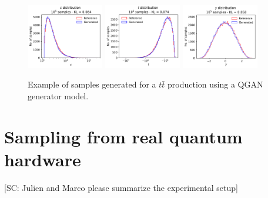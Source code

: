 \documentclass[twocolumn,preprintnumbers,superscriptaddress]{revtex4-2}
\begin{document}
\begin{figure}


  \includegraphics[width=0.3\textwidth]{plots/LHCttbar/s-distribution_LHCdata_100k.pdf}%
  \includegraphics[width=0.3\textwidth]{plots/LHCttbar/t-distribution_LHCdata_100k.pdf}%
  \includegraphics[width=0.3\textwidth]{plots/LHCttbar/y-distribution_LHCdata_100k.pdf}

  \caption{\label{fig:ttbar_2}Example of samples generated for a $t\bar{t}$
    production using a QGAN generator model.}
\end{figure}

\section{Sampling from real quantum hardware}
\label{sec:deployment}

{\color{red}[SC: Julien and Marco please summarize the experimental setup]}
\end{document}

